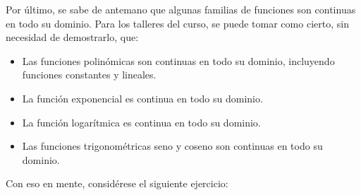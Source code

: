 \documentclass{fmbvecto}
\begin{document}
Por último, se sabe de antemano que algunas familias de funciones son continuas en todo su dominio. Para los talleres del curso, se puede tomar como cierto, sin necesidad de demostrarlo, que:
\begin{itemize}
    \item Las funciones polinómicas son continuas en todo su dominio, incluyendo funciones constantes y lineales.
    \item La función exponencial es continua en todo su dominio.
    \item La función logarítmica es continua en todo su dominio.
    \item Las funciones trigonométricas seno y coseno son continuas en todo su dominio.
\end{itemize}

\pagebreak Con eso en mente, considérese el siguiente ejercicio:
\end{document}
